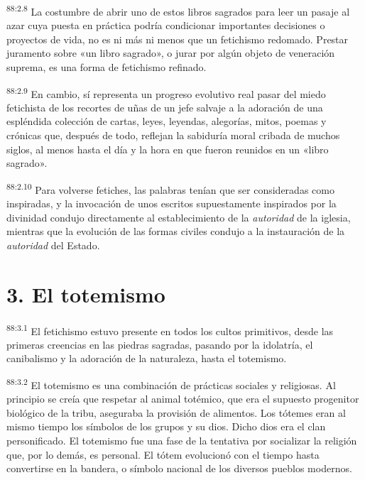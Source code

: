 \par
\textsuperscript{88:2.8} La costumbre de abrir uno de estos libros sagrados para leer un pasaje al azar cuya puesta en práctica podría condicionar importantes decisiones o proyectos de vida, no es ni más ni menos que un fetichismo redomado. Prestar juramento sobre «un libro sagrado», o jurar por algún objeto de veneración suprema, es una forma de fetichismo refinado.

\par
\textsuperscript{88:2.9} En cambio, sí representa un progreso evolutivo real pasar del miedo fetichista de los recortes de uñas de un jefe salvaje a la adoración de una espléndida colección de cartas, leyes, leyendas, alegorías, mitos, poemas y crónicas que, después de todo, reflejan la sabiduría moral cribada de muchos siglos, al menos hasta el día y la hora en que fueron reunidos en un «libro sagrado».

\par
\textsuperscript{88:2.10} Para volverse fetiches, las palabras tenían que ser consideradas como inspiradas, y la invocación de unos escritos supuestamente inspirados por la divinidad condujo directamente al establecimiento de la \textit{autoridad} de la iglesia, mientras que la evolución de las formas civiles condujo a la instauración de la \textit{autoridad} del Estado.

\section*{3. El totemismo}
\par
\textsuperscript{88:3.1} El fetichismo estuvo presente en todos los cultos primitivos, desde las primeras creencias en las piedras sagradas, pasando por la idolatría, el canibalismo y la adoración de la naturaleza, hasta el totemismo.

\par
\textsuperscript{88:3.2} El totemismo es una combinación de prácticas sociales y religiosas. Al principio se creía que respetar al animal totémico, que era el supuesto progenitor biológico de la tribu, aseguraba la provisión de alimentos. Los tótemes eran al mismo tiempo los símbolos de los grupos y su dios. Dicho dios era el clan personificado. El totemismo fue una fase de la tentativa por socializar la religión que, por lo demás, es personal. El tótem evolucionó con el tiempo hasta convertirse en la bandera, o símbolo nacional de los diversos pueblos modernos.

